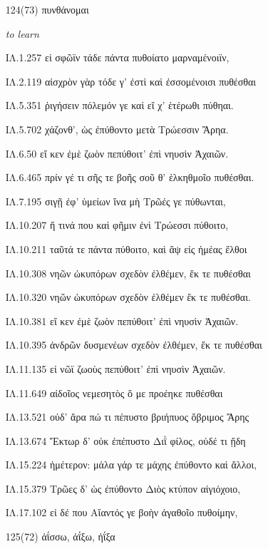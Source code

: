 \begin{enumerate}
{ΙΛ.12.24 τῶν πάντων ὁμόσε στόματ' ἔτραπε Φοῖβος Ἀπόλλων,

ΙΛ.12.32 τεῖχος ἀμαλδύνας: ποταμοὺς δ' ἔτρεψε νέεσθαι

ΙΛ.12.273 τετράφθω ποτὶ νῆας ὁμοκλητῆρος ἀκούων,

}

\clearpage
\item[\large 124(73)]{\large \g πυνθάνομαι}

\hspace{0.2cm} \textit{ to learn }

{\g
ΙΛ.1.257 εἰ σφῶϊν τάδε πάντα πυθοίατο μαρναμένοιϊν,

ΙΛ.2.119 αἰσχρὸν γὰρ τόδε γ' ἐστὶ καὶ ἐσσομένοισι πυθέσθαι

ΙΛ.5.351 ῥιγήσειν πόλεμόν γε καὶ εἴ χ' ἑτέρωθι πύθηαι.

ΙΛ.5.702 χάζονθ', ὡς ἐπύθοντο μετὰ Τρώεσσιν Ἄρηα.

ΙΛ.6.50 εἴ κεν ἐμὲ ζωὸν πεπύθοιτ' ἐπὶ νηυσὶν Ἀχαιῶν.

ΙΛ.6.465 πρίν γέ τι σῆς τε βοῆς σοῦ θ' ἑλκηθμοῖο πυθέσθαι.

ΙΛ.7.195 σιγῇ ἐφ' ὑμείων ἵνα μὴ Τρῶές γε πύθωνται,

ΙΛ.10.207 ἤ τινά που καὶ φῆμιν ἐνὶ Τρώεσσι πύθοιτο,

ΙΛ.10.211 ταῦτά τε πάντα πύθοιτο, καὶ ἂψ εἰς ἡμέας ἔλθοι

ΙΛ.10.308 νηῶν ὠκυπόρων σχεδὸν ἐλθέμεν, ἔκ τε πυθέσθαι

ΙΛ.10.320 νηῶν ὠκυπόρων σχεδὸν ἐλθέμεν ἔκ τε πυθέσθαι.

ΙΛ.10.381 εἴ κεν ἐμὲ ζωὸν πεπύθοιτ' ἐπὶ νηυσὶν Ἀχαιῶν.

ΙΛ.10.395 ἀνδρῶν δυσμενέων σχεδὸν ἐλθέμεν, ἔκ τε πυθέσθαι

ΙΛ.11.135 εἰ νῶϊ ζωοὺς πεπύθοιτ' ἐπὶ νηυσὶν Ἀχαιῶν.

ΙΛ.11.649 αἰδοῖος νεμεσητὸς ὅ με προέηκε πυθέσθαι

ΙΛ.13.521 οὐδ' ἄρα πώ τι πέπυστο βριήπυος ὄβριμος Ἄρης

ΙΛ.13.674 Ἕκτωρ δ' οὐκ ἐπέπυστο Διῒ φίλος, οὐδέ τι ᾔδη

ΙΛ.15.224 ἡμέτερον: μάλα γάρ τε μάχης ἐπύθοντο καὶ ἄλλοι,

ΙΛ.15.379 Τρῶες δ' ὡς ἐπύθοντο Διὸς κτύπον αἰγιόχοιο,

ΙΛ.17.102 εἰ δέ που Αἴαντός γε βοὴν ἀγαθοῖο πυθοίμην,

}

\clearpage
\item[\large 125(72)]{\large \g ἀΐσσω, ἀΐξω, ἠΐξα     }


\end{enumerate}
